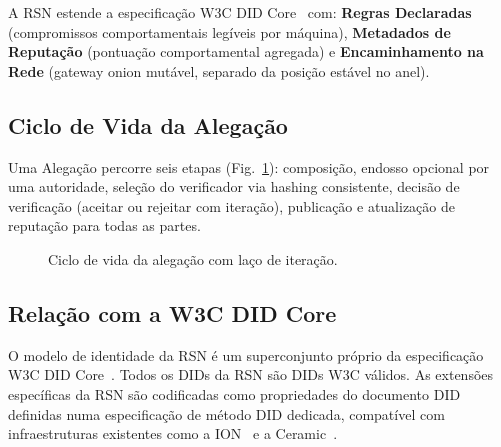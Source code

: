 \documentclass[11pt,a4paper,twocolumn]{article}
\begin{document}
A RSN estende a especificação W3C DID Core~\cite{did2022} com: \textbf{Regras Declaradas} (compromissos comportamentais legíveis por máquina), \textbf{Metadados de Reputação} (pontuação comportamental agregada) e \textbf{Encaminhamento na Rede} (gateway onion mutável, separado da posição estável no anel).

\subsection{Ciclo de Vida da Alegação}

Uma Alegação percorre seis etapas (Fig.~\ref{fig:lifecycle}): composição, endosso opcional por uma autoridade, seleção do verificador via hashing consistente, decisão de verificação (aceitar ou rejeitar com iteração), publicação e atualização de reputação para todas as partes.

\begin{figure}[ht]
\centering
{}
\caption{Ciclo de vida da alegação com laço de iteração.}
\label{fig:lifecycle}
\end{figure}

\subsection{Relação com a W3C DID Core}

O modelo de identidade da RSN é um superconjunto próprio da especificação W3C DID Core~\cite{did2022}. Todos os DIDs da RSN são DIDs W3C válidos. As extensões específicas da RSN são codificadas como propriedades do documento DID definidas numa especificação de método DID dedicada, compatível com infraestruturas existentes como a ION~\cite{buchner2021} e a Ceramic~\cite{ceramic2023}.
\end{document}

